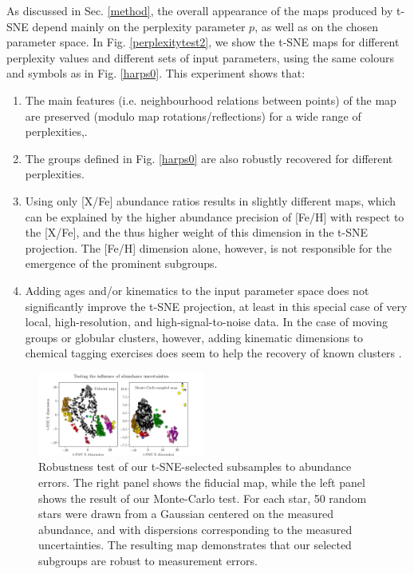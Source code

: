 \documentclass{aa}  %
\begin{document}
As discussed in Sec. \ref{method}, the overall appearance of the maps produced by t-SNE depend mainly on the perplexity parameter $p$, as well as on the chosen parameter space. In Fig. \ref{perplexitytest2}, we show the t-SNE maps for different perplexity values and different sets of input parameters, using the same colours and symbols as in Fig. \ref{harps0}. This experiment shows that: 
\begin{enumerate}
 \item The main features (i.e. neighbourhood relations between points) of the map are preserved (modulo map rotations/reflections) for a wide range of perplexities,.
 \item The groups defined in Fig. \ref{harps0} are also robustly recovered for different perplexities.
 \item Using only [X/Fe] abundance ratios results in slightly different maps, which can be explained by the higher abundance precision of [Fe/H] with respect to the [X/Fe], and the thus higher weight of this dimension in the t-SNE projection. The [Fe/H] dimension alone, however, is not responsible for the emergence of the prominent subgroups.
 \item Adding ages and/or kinematics to the input parameter space does not significantly improve the t-SNE projection, at least in this special case of very local, high-resolution, and high-signal-to-noise data.%
 In the case of moving groups or globular clusters, however, adding kinematic dimensions to chemical tagging exercises does seem to help the recovery of known clusters \citep{Chen2017}.
\end{enumerate}

\begin{figure}\centering
 \includegraphics[width=0.49\textwidth]{im/harps_tsne-mctest_teffcut.png}
\caption{Robustness test of our t-SNE-selected subsamples to abundance errors. The right panel shows the fiducial map, while the left panel shows the result of our Monte-Carlo test. For each star, 50 random stars were drawn from a Gaussian centered on the measured abundance, and with dispersions corresponding to the measured uncertainties. The resulting map demonstrates that our selected subgroups are robust to measurement errors.}
\label{mctest}
\end{figure}
\end{document}
